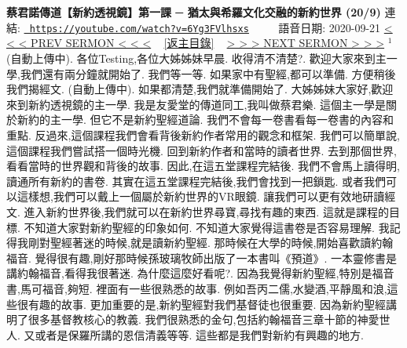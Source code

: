 \documentclass{book}
\begin{document}
\section{}
\label{sec:6Yg3FVlhsxs}
\textbf{蔡君諾傳道【新約透視鏡】第一課 ─ 猶太與希羅文化交融的新約世界 (20/9)}
\newline
\newline
連結: \href{https://youtube.com/watch?v=6Yg3FVlhsxs}{\texttt{ https://youtube.com/watch?v=6Yg3FVlhsxs}} ~~~~ 語音日期: 2020-09-21 
\newline
\newline
\hyperref[sec:UH_c8ivdgzM]{\small{< < < PREV SERMON < < <}}
~
\hyperref[sec:index]{\small{[返主目錄]}}
~
\hyperref[sec:FpXj_b1Te98]{\small{> > > NEXT SERMON > > >}}
\newline
\newline
$^{1}$(自動上傳中).
各位Testing,各位大姊姊妹早晨.
收得清不清楚?.
歡迎大家來到主一學,我們還有兩分鐘就開始了.
我們等一等.
如果家中有聖經,都可以準備.
方便稍後我們揭經文.
(自動上傳中).
如果都清楚,我們就準備開始了.
大姊姊妹大家好,歡迎來到新約透視鏡的主一學.
我是友愛堂的傳道同工,我叫做蔡君樂.
這個主一學是關於新約的主一學.
但它不是新約聖經道論.
我們不會每一卷書看每一卷書的內容和重點.
反過來,這個課程我們會看背後新約作者常用的觀念和框架.
我們可以簡單說,這個課程我們嘗試搭一個時光機.
回到新約作者和當時的讀者世界.
去到那個世界,看看當時的世界觀和背後的故事.
因此,在這五堂課程完結後.
我們不會馬上讀得明,讀通所有新約的書卷.
其實在這五堂課程完結後,我們會找到一把鎖匙.
或者我們可以這樣想,我們可以戴上一個屬於新約世界的VR眼鏡.
讓我們可以更有效地研讀經文.
進入新約世界後,我們就可以在新約世界尋寶,尋找有趣的東西.
這就是課程的目標.
不知道大家對新約聖經的印象如何.
不知道大家覺得這書卷是否容易理解.
我記得我剛對聖經著迷的時候,就是讀新約聖經.
那時候在大學的時候,開始喜歡讀約翰福音.
覺得很有趣,剛好那時候孫玻璃牧師出版了一本書叫《預道》.
一本靈修書是講約翰福音,看得我很著迷.
為什麼這麼好看呢?.
因為我覺得新約聖經,特別是福音書,馬可福音,夠短.
裡面有一些很熟悉的故事.
例如吾丙二儒,水變酒,平靜風和浪,這些很有趣的故事.
更加重要的是,新約聖經對我們基督徒也很重要.
因為新約聖經講明了很多基督教核心的教義.
我們很熟悉的金句,包括約翰福音三章十節的神愛世人.
又或者是保羅所講的恩信清義等等.
這些都是我們對新約有興趣的地方.
\end{document}

